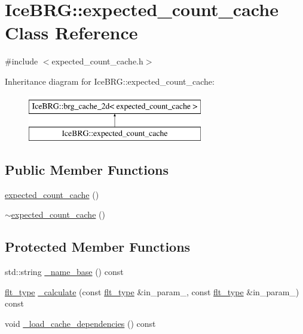 \hypertarget{classIceBRG_1_1expected__count__cache}{}\section{Ice\+B\+R\+G\+:\+:expected\+\_\+count\+\_\+cache Class Reference}
\label{classIceBRG_1_1expected__count__cache}


{\ttfamily \#include $<$expected\+\_\+count\+\_\+cache.\+h$>$}

Inheritance diagram for Ice\+B\+R\+G\+:\+:expected\+\_\+count\+\_\+cache\+:\begin{figure}[H]
\begin{center}
\leavevmode
\includegraphics[height=2.000000cm]{classIceBRG_1_1expected__count__cache}
\end{center}
\end{figure}
\subsection*{Public Member Functions}
\begin{DoxyCompactItemize}
\item 
\hyperlink{classIceBRG_1_1expected__count__cache_a2f0071d1fddd08d805724fc199631fd1}{expected\+\_\+count\+\_\+cache} ()
\item 
\hyperlink{classIceBRG_1_1expected__count__cache_a817a41f05b8d36b3791924ceb47a6f5b}{$\sim$expected\+\_\+count\+\_\+cache} ()
\end{DoxyCompactItemize}
\subsection*{Protected Member Functions}
\begin{DoxyCompactItemize}
\item 
std\+::string \hyperlink{classIceBRG_1_1expected__count__cache_a07cb2c99bf0bfba61a2da77300a6061f}{\+\_\+name\+\_\+base} () const 
\item 
\hyperlink{lib_2IceBRG__main_2common_8h_ad0f130a56eeb944d9ef2692ee881ecc4}{flt\+\_\+type} \hyperlink{classIceBRG_1_1expected__count__cache_a9b18a3e02060bd0cde404eff18fb8343}{\+\_\+calculate} (const \hyperlink{lib_2IceBRG__main_2common_8h_ad0f130a56eeb944d9ef2692ee881ecc4}{flt\+\_\+type} \&in\+\_\+param\+\_, const \hyperlink{lib_2IceBRG__main_2common_8h_ad0f130a56eeb944d9ef2692ee881ecc4}{flt\+\_\+type} \&in\+\_\+param\+\_) const 
\item 
void \hyperlink{classIceBRG_1_1expected__count__cache_a6047eeb391a812c90e190b712d2a33fc}{\+\_\+load\+\_\+cache\+\_\+dependencies} () const 
\end{DoxyCompactItemize}
